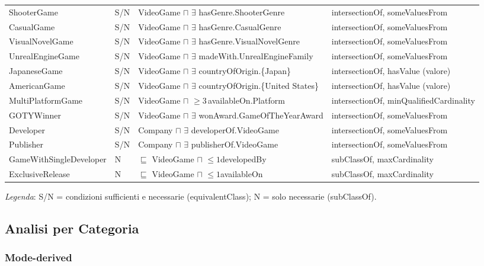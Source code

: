 \begin{longtable}{ll>{\raggedright\arraybackslash}p{6.4cm}>{\raggedright\arraybackslash}p{3.4cm}}
ShooterGame           & S/N & VideoGame $\sqcap$ $\exists$ hasGenre.ShooterGenre & intersectionOf, someValuesFrom \\
CasualGame            & S/N & VideoGame $\sqcap$ $\exists$ hasGenre.CasualGenre & intersectionOf, someValuesFrom \\
VisualNovelGame       & S/N & VideoGame $\sqcap$ $\exists$ hasGenre.VisualNovelGenre & intersectionOf, someValuesFrom \\
UnrealEngineGame      & S/N & VideoGame $\sqcap$ $\exists$ madeWith.UnrealEngineFamily & intersectionOf, someValuesFrom \\
JapaneseGame          & S/N & VideoGame $\sqcap$ $\exists$ countryOfOrigin.\{Japan\} & intersectionOf, hasValue (valore) \\
AmericanGame          & S/N & VideoGame $\sqcap$ $\exists$ countryOfOrigin.\{United States\} & intersectionOf, hasValue (valore) \\
MultiPlatformGame     & S/N & VideoGame $\sqcap$ $\geq3$\,availableOn.Platform & intersectionOf, minQualifiedCardinality \\
GOTYWinner          & S/N & VideoGame $\sqcap$ $\exists$ wonAward.GameOfTheYearAward & intersectionOf, someValuesFrom \\
Developer           & S/N & Company $\sqcap$ $\exists$ developerOf.VideoGame & intersectionOf, someValuesFrom \\
Publisher           & S/N & Company $\sqcap$ $\exists$ publisherOf.VideoGame & intersectionOf, someValuesFrom \\
GameWithSingleDeveloper & N & $\sqsubseteq$ VideoGame $\sqcap$ $\leq1$developedBy     & subClassOf, maxCardinality \\
ExclusiveRelease    & N & $\sqsubseteq$ VideoGame $\sqcap$ $\leq1$availableOn        & subClassOf, maxCardinality \\
\bottomrule
\end{longtable}
\endgroup

\textit{Legenda}: S/N = condizioni sufficienti e necessarie (equivalentClass);
N = solo necessarie (subClassOf).

\subsection{Analisi per Categoria}

\subsubsection{Mode-derived}

